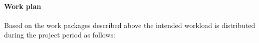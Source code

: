 \documentclass[enabledeprecatedfontcommands,cleardoublepage=empty,headsepline,twoside,11pt,DIV=15,BCOR=12mm,final]{scrartcl}
\begin{document}
%

\paragraph{Work plan}
Based on the work packages described above the intended workload is distributed during the project period as follows:\\ 
\end{document}
